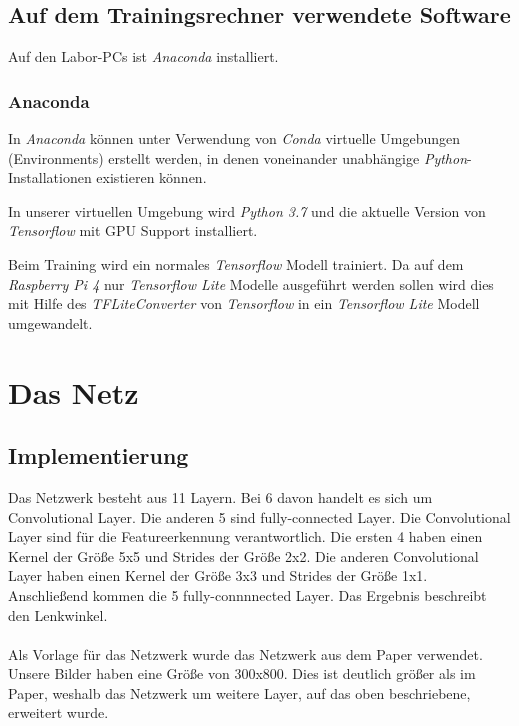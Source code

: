 \documentclass[a4paper, 12pt]{scrartcl}
\begin{document}
				
		
		\subsection{Auf dem Trainingsrechner verwendete Software}
		Auf den Labor-PCs ist \emph{Anaconda} installiert.
			\subsubsection{Anaconda}
			In \emph{Anaconda} können unter Verwendung von \emph{Conda} virtuelle Umgebungen (Environments) erstellt werden, in denen voneinander unabhängige \emph{Python}-Installationen existieren können. 
			
			In unserer virtuellen Umgebung wird \emph{Python 3.7} und die aktuelle Version von \emph{Tensorflow} mit GPU Support installiert.
			
			Beim Training wird ein normales \emph{Tensorflow} Modell trainiert. Da auf dem  \emph{Raspberry Pi 4} nur \emph{Tensorflow Lite} Modelle ausgeführt werden sollen wird dies mit Hilfe des \emph{TFLiteConverter} von  \emph{Tensorflow}  in ein \emph{Tensorflow Lite} Modell umgewandelt.
			
	
			
		\section{Das Netz}
			\subsection{Implementierung}
			Das Netzwerk besteht aus 11 Layern. Bei 6 davon handelt es sich um Convolutional Layer. Die anderen 5 sind fully-connected Layer. Die Convolutional Layer sind für die Featureerkennung verantwortlich. Die ersten 4 haben einen Kernel der Größe 5x5 und Strides der Größe 2x2. Die anderen Convolutional Layer haben einen Kernel der Größe 3x3 und Strides der Größe 1x1. Anschließend kommen die 5 fully-connnnected Layer. Das Ergebnis beschreibt den Lenkwinkel. \\ \\
			Als Vorlage für das Netzwerk wurde das Netzwerk aus dem Paper \cite{article} verwendet. Unsere Bilder haben eine Größe von 300x800. Dies ist deutlich größer als im Paper, weshalb das Netzwerk um weitere Layer, auf das oben beschriebene, erweitert wurde.
		
\end{document}
